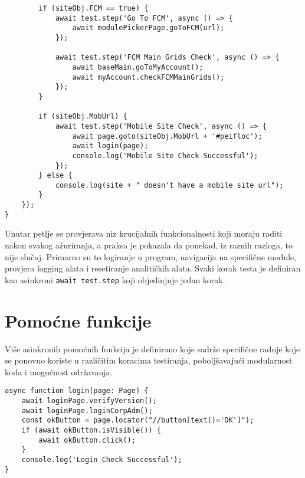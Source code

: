 \begin{verbatim}
        if (siteObj.FCM == true) {
            await test.step('Go To FCM', async () => {
                await modulePickerPage.goToFCM(url);
            });

            await test.step('FCM Main Grids Check', async () => {
                await baseMain.goToMyAccount();
                await myAccount.checkFCMMainGrids();
            });
        }

        if (siteObj.MobUrl) {
            await test.step('Mobile Site Check', async () => {
                await page.goto(siteObj.MobUrl + '#peifloc');
                await login(page);
                console.log('Mobile Site Check Successful');
            });
        } else {
            console.log(site + " doesn't have a mobile site url");
        }
    });
}
\end{verbatim}

Unutar petlje se provjerava niz krucijalnih funkcionalnosti koji moraju raditi nakon svakog ažuriranja, a praksa je pokazala da ponekad, iz raznih razloga, to nije slučaj.
Primarno su to logiranje u program, navigacija na specifične module, provjera logging alata i resetiranje analitičkih alata.
Svaki korak testa je definiran kao asinkroni \texttt{await test.step} koji objedinjuje jedan korak.

\section{Pomoćne funkcije}

Više asinkronih pomoćnih funkcija je definirano koje sadrže specifične radnje koje se ponovno koriste u različitim koracima testiranja, poboljšavajući modularnost koda i mogućnost održavanja.

\begin{verbatim}
async function login(page: Page) {
    await loginPage.verifyVersion();
    await loginPage.loginCorpAdm();
    const okButton = page.locator("//button[text()='OK']");
    if (await okButton.isVisible()) {
        await okButton.click();
    }
    console.log('Login Check Successful');
}
\end{verbatim}
